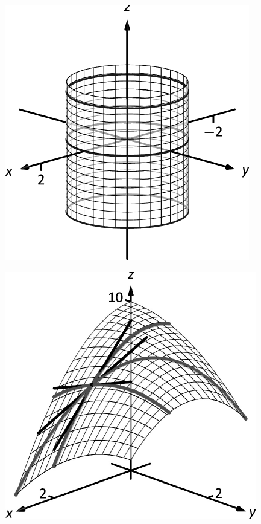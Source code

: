 \documentclass[10pt]{article}
\begin{document}
\includegraphics{figspacecylinder1b_3DBW.pdf}
\texttt{}

\includegraphics{figspace_tangent_intro_3DBW.pdf}
\texttt{}
\end{document}
